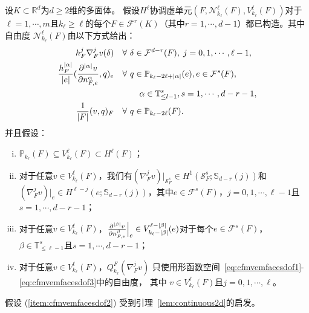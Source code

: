 设$K\subset\mathbb R^d$为$d\geq 2$维的多面体。
假设$H^{\ell}$协调虚单元$(F, \mathcal N_{k_{\ell}}^{\ell}(F),
V_{k_{\ell}}^{\ell}(F))$对于$\ell=1,\cdots,
m$且$k_{\ell}\geq\ell$的每个$F\in\mathcal F^r(K)$（其中$r=1,\cdots,
d-1$）都已构造。其中自由度 $\mathcal N_{k_{\ell}}^{\ell}(F)$由以下方式给出：
\begin{align}
h_F^j\nabla_F^{j}v(\delta) & \quad\forall~\delta\in\mathcal F^{d-r}(F), \;j=0,1,\cdots,\ell-1, \label{eq:cfmvemfacesdof1}\\
\frac{h_F^{|\alpha|}}{|e|}(\frac{\partial^{|\alpha|}v}{\partial n_{F,e}^{\alpha}}, q)_e & \quad\forall~q\in\mathbb P_{k_{\ell}-2\ell+|\alpha|}(e), e\in\mathcal F^{s}(F), \; \label{eq:cfmvemfacesdof2}\\
&\quad \quad \quad \alpha\in \mathbb{T}^s_{\leq l-1}, s=1,\cdots,d-r-1,\notag\\
\frac{1}{|F|}(v, q)_F & \quad\forall~q\in\mathbb P_{k_{\ell}-2\ell}(F). \label{eq:cfmvemfacesdof3}
\end{align}
并且假设：
\begin{enumerate}[(i)]
\item \label{item:cfmvemfacesdof1} 
    $\mathbb P_{k_{\ell}}(F)\subseteq V_{k_{\ell}}^{\ell}(F)\subset H^{\ell}(F)$；
\item \label{item:cfmvemfacesdof2} 
    对于任意$v\in V_{k_{\ell}}^{\ell}(F)$，我们有$(\nabla_F^jv)|_{\mathcal
    S_F^s}\in H^{1}(\mathcal S_F^s; \mathbb S_{d-r}(j))$和$(\nabla_F^jv)|_{e}\in
    H^{\ell-j}(e; \mathbb S_{d-r}(j))$，其中$e\in\mathcal
    F^s(F)$，$j=0,1,\cdots,\ell-1$且$s=1,\cdots, d-r-1$；
\item \label{item:cfmvemfacesdof3} 
    对于任意$v\in
    V_{k_{\ell}}^{\ell}(F)$，$\frac{\partial^{|\beta|}v}{\partial
    n_{F,e}^{\beta}}\Big|_{e}\in
    V_{k_{\ell}-|\beta|}^{\ell-|\beta|}(e)$对于每个$e\in\mathcal
    F^s(F)$，$\beta\in \mathbb{T}_{\leq\ell-1}^s$且$s=1,\cdots, d-r-1$；
\item \label{item:cfmvemfacesdof4} 
    对于任意$v\in
    V_{k_{\ell}}^{\ell}(F)$，$Q_{k_{\ell}}^F(\nabla_F^jv)$
    只使用形函数空间~\eqref{eq:cfmvemfacesdof1}-\eqref{eq:cfmvemfacesdof3}中的自由度，
    其中 $v\in V_{k_{\ell}}^{\ell}(F)$且$j=0,1,\cdots, \ell$。
\end{enumerate}
假设 (\ref{item:cfmvemfacesdof2}) 受到引理~\ref{lem:continuous2d}的启发。


